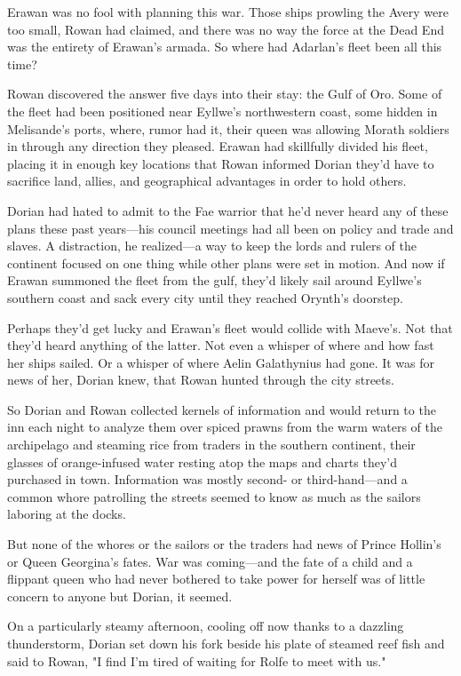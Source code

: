 Erawan was no fool with planning this war. Those ships prowling the Avery were too small, Rowan had claimed, and there was no way the force at the Dead End was the entirety of Erawan's armada. So where had Adarlan's fleet been all this time?

Rowan discovered the answer five days into their stay: the Gulf of Oro. Some of the fleet had been positioned near Eyllwe's northwestern coast, some hidden in Melisande's ports, where, rumor had it, their queen was allowing Morath soldiers in through any direction they pleased. Erawan had skillfully divided his fleet, placing it in enough key locations that Rowan informed Dorian they'd have to sacrifice land, allies, and geographical advantages in order to hold others.

Dorian had hated to admit to the Fae warrior that he'd never heard any of these plans these past years---his council meetings had all been on policy and trade and slaves. A distraction, he realized---a way to keep the lords and rulers of the continent focused on one thing while other plans were set in motion. And now  if Erawan summoned the fleet from the gulf, they'd likely sail around Eyllwe's southern coast and sack every city until they reached Orynth's doorstep.

Perhaps they'd get lucky and Erawan's fleet would collide with Maeve's. Not that they'd heard anything of the latter. Not even a whisper of where and how fast her ships sailed. Or a whisper of where Aelin Galathynius had gone. It was for news of her, Dorian knew, that Rowan hunted through the city streets.

So Dorian and Rowan collected kernels of information and would return to the inn each night to analyze them over spiced prawns from the warm waters of the archipelago and steaming rice from traders in the southern continent, their glasses of orange-infused water resting atop the maps and charts they'd purchased in town. Information was mostly second- or third-hand---and a common whore patrolling the streets seemed to know as much as the sailors laboring at the docks.

But none of the whores or the sailors or the traders had news of Prince Hollin's or Queen Georgina's fates. War was coming---and the fate of a child and a flippant queen who had never bothered to take power for herself was of little concern to anyone but Dorian, it seemed.

On a particularly steamy afternoon, cooling off now thanks to a dazzling thunderstorm, Dorian set down his fork beside his plate of steamed reef fish and said to Rowan, "I find I'm tired of waiting for Rolfe to meet with us."

